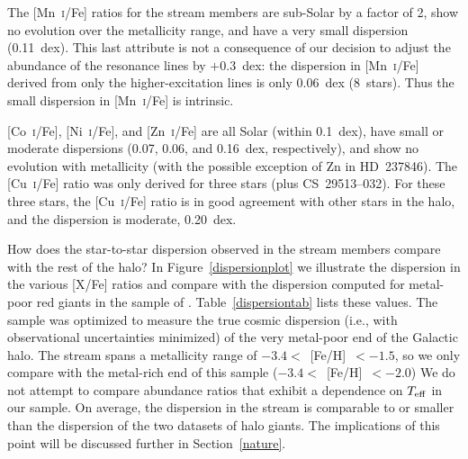 \documentclass{emulateapj}
\begin{document}
The [Mn~\textsc{i}/Fe] ratios for the stream members are
sub-Solar by a factor of 2, show no evolution over the metallicity
range, and have a very small dispersion (0.11~dex).
This last attribute is not a consequence of our decision
to adjust the abundance of the resonance lines by $+$0.3~dex:
the dispersion in [Mn~\textsc{i}/Fe] derived from
only the higher-excitation lines is only 0.06~dex (8~stars).
Thus the small dispersion in [Mn~\textsc{i}/Fe] is intrinsic.

[Co~\textsc{i}/Fe], [Ni~\textsc{i}/Fe], and [Zn~\textsc{i}/Fe]
are all Solar (within 0.1~dex),
have small or moderate dispersions 
(0.07, 0.06, and 0.16~dex, respectively), and
show no evolution with metallicity (with the possible exception 
of Zn in \mbox{HD~237846}).
The [Cu~\textsc{i}/Fe] ratio was only derived for three stars
(plus \mbox{CS~29513--032}).
For these three stars, the [Cu~\textsc{i}/Fe] ratio is in 
good agreement with other stars in the halo, and the dispersion is
moderate, 0.20~dex.

How does the star-to-star dispersion observed in the stream members
compare with the rest of the halo?
In Figure~\ref{dispersionplot} we illustrate the dispersion in the
various [X/Fe] ratios and compare with the dispersion computed for
metal-poor red giants in the sample of \citet{cayrel04}.
Table~\ref{dispersiontab} lists these values.
The \citet{cayrel04} sample was optimized to measure 
the true cosmic dispersion 
(i.e., with observational uncertainties minimized)
of the very metal-poor end of the Galactic halo.
The stream spans a metallicity range of $-3.4 <$~[Fe/H]~$< -1.5$, so
we only compare with the metal-rich end of this sample
($-3.4 <$~[Fe/H]~$< -2.0$)
We do not attempt to compare abundance ratios that exhibit a
dependence on $T_{\rm eff}$ in our sample.
On average, the dispersion in the stream is comparable to 
or smaller than the dispersion of the two datasets of halo giants.
The implications of this point will be discussed further in 
Section~\ref{nature}.
\end{document}
